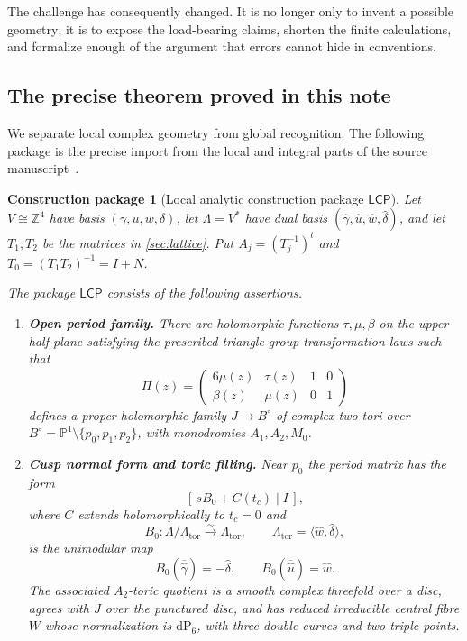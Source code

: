 \documentclass[11pt,reqno]{amsart}
\numberwithin{equation}{section}
\newcommand{\Z}{\mathbb Z}
\newcommand{\Pone}{\mathbb P^1}
\newcommand{\dP}{\mathrm{dP}_6}
\newcommand{\wideg}{\widehat\gamma}
\newcommand{\wideu}{\widehat u}
\newcommand{\widew}{\widehat w}
\newcommand{\wided}{\widehat\delta}
\newcommand{\LambdaTor}{\Lambda_{\mathrm{tor}}}
\newcommand{\LCP}{\mathsf{LCP}}
\newtheorem{construction}[theorem]{Construction package}
\theoremstyle{definition}
\begin{document}
The challenge has consequently changed. It is no longer only to invent a possible geometry; it is to expose the load-bearing claims, shorten the finite calculations, and formalize enough of the argument that errors cannot hide in conventions.

\subsection{The precise theorem proved in this note}

We separate local complex geometry from global recognition. The following package is the precise import from the local and integral parts of the source manuscript~\cite[\S\S2--7]{S6}.

\begin{construction}[Local analytic construction package $\LCP$]\label{pkg:lcp}
Let $V\cong\Z^4$ have basis $(\gamma,u,w,\delta)$, let $\Lambda=V^*$ have dual basis $(\wideg,\wideu,\widew,\wided)$, and let $T_1,T_2$ be the matrices in \cref{sec:lattice}. Put $A_j=(T_j^{-1})^t$ and $T_0=(T_1T_2)^{-1}=I+N$.

The package $\LCP$ consists of the following assertions.
\begin{enumerate}[label=\textup{(L\arabic*)}]
\item \textbf{Open period family.} There are holomorphic functions $\tau,\mu,\beta$ on the upper half-plane satisfying the prescribed triangle-group transformation laws such that
\[
 \Pi(z)=
 \begin{pmatrix}
 6\mu(z)&\tau(z)&1&0\\
 \beta(z)&\mu(z)&0&1
 \end{pmatrix}
\]
defines a proper holomorphic family $J\to B^\circ$ of complex two-tori over
$B^\circ=\Pone\setminus\{p_0,p_1,p_2\}$, with monodromies $A_1,A_2,M_0$.

\item \textbf{Cusp normal form and toric filling.} Near $p_0$ the period matrix has the form
\[
 [\,sB_0+C(t_c)\mid I\,],
\]
where $C$ extends holomorphically to $t_c=0$ and
\[
 B_0:\Lambda/\LambdaTor\xrightarrow{\sim}\LambdaTor,
 \qquad
 \LambdaTor=\langle\widew,\wided\rangle,
\]
is the unimodular map
\[
 B_0(\overline{\wideg})=-\wided,
 \qquad
 B_0(\overline{\wideu})=\widew.
\]
The associated $A_2$-toric quotient is a smooth complex threefold over a disc, agrees with $J$ over the punctured disc, and has reduced irreducible central fibre $W$ whose normalization is $\dP$, with three double curves and two triple points.


\end{enumerate}
\end{construction}
\end{document}
